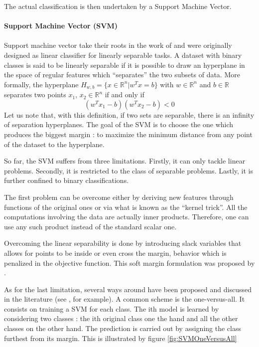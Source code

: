 \documentclass[a4paper]{report}
\begin{document}
		The actual classification is then undertaken by a Support Machine Vector. %
		\begin{leftbar}
			\paragraph{Support Machine Vector (SVM)}
			\paragraph{}
			Support machine vector take their roots in the work of \cite{svm} and were originally designed as linear classifier for linearly separable tasks. A dataset with binary classes is said to be linearly separable if it is possible to draw an hyperplane in the space of regular features which ``separates'' the two subsets of data.
			More formally, the hyperplane $H_{w,b} = \{x \in \mathbb{R}^n | w^T x = b\}$ with $w \in \mathbb{R}^n$ and $b \in \mathbb{R}$ separates two points $x_1$, $x_2 \in \mathbb{R}^n$ if and only if 
			\[
				(w^T x_1 - b)(w^T x_2 - b) < 0
			\] 
			Let us note that, with this definition, if two sets are separable, there is an infinity of separation hyperplanes. The goal of the SVM is to choose the one which produces the biggest margin : to maximize the minimum distance from any point of the dataset to the hyperplane.
			\par
			So far, the SVM suffers from three limitations. Firstly, it can only tackle linear problems. Secondly, it is restricted to the class of separable problems. Lastly, it is further confined to binary classifications. 
			\par
			The first problem can be overcome either by deriving new features through functions of the original ones or via what is known as the ``kernel trick''. All the computations involving the data are actually inner products. Therefore, one can use any such product instead of the standard scalar one. 
			\par
			Overcoming the linear separability is done by introducing slack variables that allows for points to be inside or even cross the margin, behavior which is penalized in the objective function. This soft margin formulation was proposed by \cite{svmsoft}.
			\par
			As for the last limitation, several ways around have been proposed and discussed in the literature (see \cite{svmmulticlass}, for example). A common scheme is the one-versus-all. It consists on training a SVM for each class. The ith model is learned by considering two classes : the ith original class one the hand and all the other classes on the other hand. The prediction is carried out by assigning the class furthest from its margin. This is illustrated by figure \ref{fig:SVMOneVersusAll}
		\end{leftbar}
\end{document}
